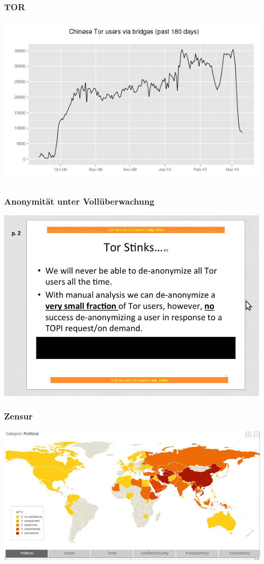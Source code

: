 \documentclass[12pt]{beamer}
\begin{document}
\begin{frame}
    \frametitle{TOR}
    \includegraphics[height=0.7\textheight]{img/bridge2.png}
\end{frame}

\begin{frame}
    \frametitle{Anonymität unter Vollüberwachung}
    \includegraphics[height=0.7\textheight]{img/torstinks.png}
\end{frame}

\begin{frame}
    \frametitle{Zensur}
    \includegraphics[height=0.7\textheight]{img/zensur-guardian.jpg}
\end{frame}
\end{document}
